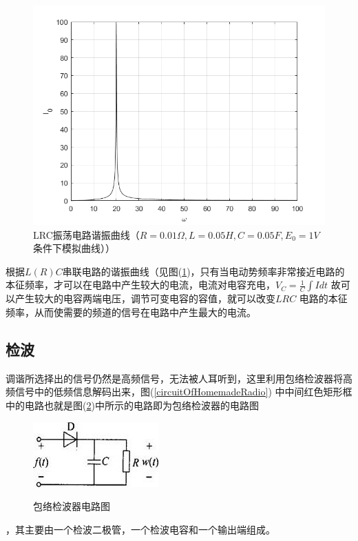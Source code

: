 \documentclass[10pt,a4paper]{article}
\theoremstyle{remark}
\begin{document}
\begin{figure}
  \centering
  \includegraphics[scale = 0.5]{LRC}\caption{LRC振荡电路谐振曲线（$R = 0.01 \Omega, L = 0.05H, C = 0.05F, E_0 = 1V$条件下模拟曲线））}  \label{LRC}
\end{figure}

根据$L (R)C$串联电路的谐振曲线（见图(\ref{LRC})，只有当电动势频率非常接近电路的本征频率，才可以在电路中产生较大的电流，电流对电容充电，$V_C = \frac{1}{C}\int Idt$ 故可以产生较大的电容两端电压，调节可变电容的容值，就可以改变$LRC$ 电路的本征频率，从而使需要的频道的信号在电路中产生最大的电流。

\subsection{检波}
调谐所选择出的信号仍然是高频信号，无法被人耳听到，这里利用包络检波器将高频信号中的低频信息解码出来，图(\ref{circuitOfHomemadeRadio}) 中中间红色矩形框中的电路也就是图(\ref{circuitOfEnvelopeRadio})中所示的电路即为包络检波器的电路图
\begin{figure}
  \centering
  \includegraphics[scale = 1]{circuitOfEnvelopeDetector}\\
  \caption{包络检波器电路图}\label{circuitOfEnvelopeRadio}
\end{figure}
，其主要由一个检波二极管，一个检波电容和一个输出端组成。
\end{document}
